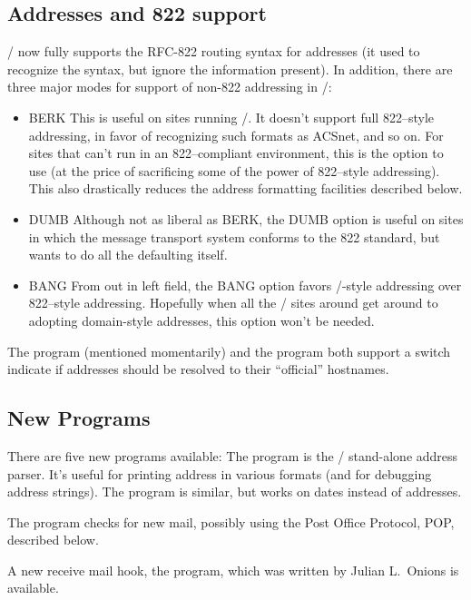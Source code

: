 \subsection*	{Addresses and 822 support}
\MH/ now fully supports the RFC-822 routing syntax for addresses
(it used to recognize the syntax, but ignore the information present).
In addition,
there are three major modes for support of non-822 addressing in \MH/:
\begin{itemize}
\item	BERK\hbreak
This is useful on sites running \SendMail/.
It doesn't support full 822--style addressing,
in favor of recognizing such formats as ACSnet, and so on.
For sites that can't run in an 822--compliant environment,
this is the option to use
(at the price of sacrificing some of the power of 822--style addressing).
This also drastically reduces the address formatting facilities described
below.

\item	DUMB\hbreak
Although not as liberal as BERK,
the DUMB option is useful on sites in which the message transport system
conforms to the 822 standard,
but wants to do all the defaulting itself.

\item	BANG\hbreak
From out in left field,
the BANG option favors \UUCP/-style addressing over 822--style addressing.
Hopefully when all the \UUCP/ sites around get around to adopting domain-style
addresses, this option won't be needed.
\end{itemize}

The  program (mentioned momentarily) and the  program
both support a  switch indicate if addresses should be
resolved to their ``official'' hostnames.

\subsection*	{New Programs}
There are five new programs available:
The  program is the \MH/ stand-alone address parser.
It's useful for printing address in various formats
(and for debugging address strings).
The  program is similar, but works on dates instead of addresses.

The  program checks for new mail,
possibly using the Post Office Protocol, POP, described below.

A new receive mail hook,
the  program,
which was written by Julian L.~Onions is available.


